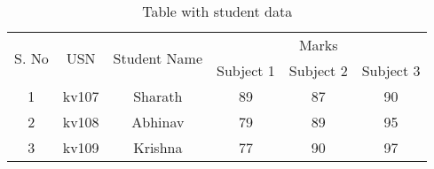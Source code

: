 \documentclass{article}
\begin{document}
	
	\begin{table}[h!]
		
		\centering
		
		\caption{Table with student data}
		
		\label{tab:table}
		
		\begin{tabular}{|c|c|c|c|c|c|}
			
			\hline
			
			\multirow{2}{*}{S. No} & \multirow{2}{*}{USN} &
			\multirow{2}{*}{Student Name} & \multicolumn{3}{c|}{Marks} \\
			
			\cline{4-6}
			
			& & & Subject 1 & Subject 2 & Subject 3 \\
			
			\hline
			
			1 & kv107 & Sharath & 89 & 87 & 90 \\
			
			\hline
			
			2 & kv108 & Abhinav & 79 & 89 & 95 \\
			
			\hline
			
			3 & kv109 & Krishna & 77 & 90 & 97 \\
			
			\hline
			
		\end{tabular}
		
	\end{table}
\end{document}
